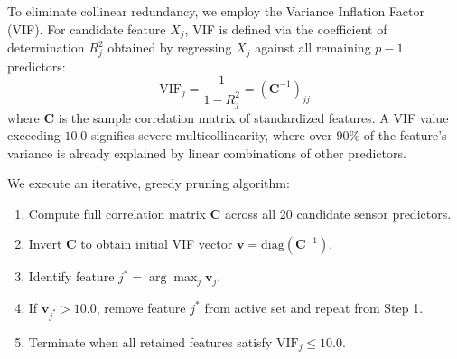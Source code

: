 To eliminate collinear redundancy, we employ the Variance Inflation Factor (VIF). For candidate feature $X_j$, VIF is defined via the coefficient of determination $R_j^2$ obtained by regressing $X_j$ against all remaining $p-1$ predictors:
\begin{equation}
    \text{VIF}_j = \frac{1}{1 - R_j^2} = (\mathbf{C}^{-1})_{jj}
    \label{eq:vif_formula}
\end{equation}
where $\mathbf{C}$ is the sample correlation matrix of standardized features. A VIF value exceeding $10.0$ signifies severe multicollinearity, where over $90\%$ of the feature's variance is already explained by linear combinations of other predictors.

We execute an iterative, greedy pruning algorithm:
\begin{enumerate}
    \item Compute full correlation matrix $\mathbf{C}$ across all 20 candidate sensor predictors.
    \item Invert $\mathbf{C}$ to obtain initial VIF vector $\mathbf{v} = \text{diag}(\mathbf{C}^{-1})$.
    \item Identify feature $j^* = \arg\max_j \mathbf{v}_j$.
    \item If $\mathbf{v}_{j^*} > 10.0$, remove feature $j^*$ from active set and repeat from Step 1.
    \item Terminate when all retained features satisfy $\text{VIF}_j \le 10.0$.
\end{enumerate}

